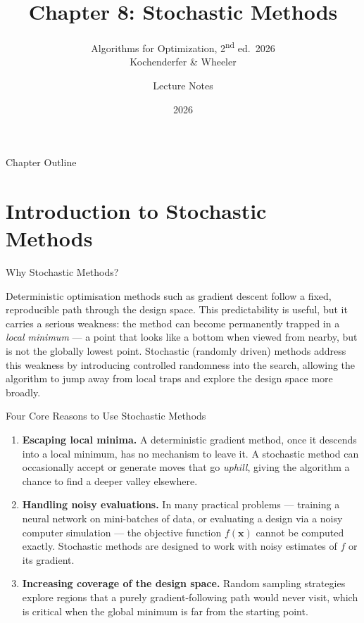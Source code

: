 \documentclass[aspectratio=169,10pt]{beamer}
\title[Ch.~8: Stochastic Methods]{Chapter 8: Stochastic Methods}
\subtitle{Algorithms for Optimization, 2\textsuperscript{nd} ed.\ 2026\\
  Kochenderfer \& Wheeler}
\author{Lecture Notes}
\date{2026}
\begin{document}
\begin{frame}
  \titlepage
\end{frame}

\begin{frame}{Chapter Outline}
  \tableofcontents
\end{frame}

\section{Introduction to Stochastic Methods}

\begin{frame}[allowframebreaks]{Why Stochastic Methods?}

Deterministic optimisation methods such as gradient descent follow a fixed, reproducible path through the design space.
This predictability is useful, but it carries a serious weakness: the method can become permanently trapped in a \emph{local minimum} --- a point that looks like a bottom when viewed from nearby, but is not the globally lowest point.
Stochastic (randomly driven) methods address this weakness by introducing controlled randomness into the search, allowing the algorithm to jump away from local traps and explore the design space more broadly.

\begin{block}{Four Core Reasons to Use Stochastic Methods}
\begin{enumerate}
  \item \textbf{Escaping local minima.} A deterministic gradient method, once it descends into a local minimum, has no mechanism to leave it. A stochastic method can occasionally accept or generate moves that go \emph{uphill}, giving the algorithm a chance to find a deeper valley elsewhere.

  \item \textbf{Handling noisy evaluations.} In many practical problems --- training a neural network on mini-batches of data, or evaluating a design via a noisy computer simulation --- the objective function $f(\mathbf{x})$ cannot be computed exactly. Stochastic methods are designed to work with noisy estimates of $f$ or its gradient.

  \item \textbf{Increasing coverage of the design space.} Random sampling strategies explore regions that a purely gradient-following path would never visit, which is critical when the global minimum is far from the starting point.


\end{enumerate}
\end{block}
\end{frame}
\end{document}
